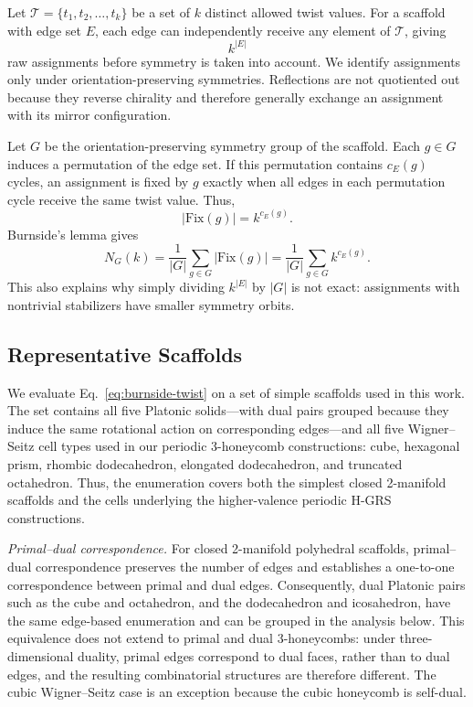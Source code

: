 \documentclass[acmtog]{acmart}
\begin{document}
Let $\mathcal{T}=\{t_1,t_2,\ldots,t_k\}$ be a set of $k$ distinct allowed twist values. For a scaffold with edge set $E$, each edge can independently receive any element of $\mathcal{T}$, giving
\begin{equation}
k^{|E|}
\end{equation}
raw assignments before symmetry is taken into account. We identify assignments only under orientation-preserving symmetries. Reflections are not quotiented out because they reverse chirality and therefore generally exchange an assignment with its mirror configuration.

Let $G$ be the orientation-preserving symmetry group of the scaffold. Each $g\in G$ induces a permutation of the edge set. If this permutation contains $c_E(g)$ cycles, an assignment is fixed by $g$ exactly when all edges in each permutation cycle receive the same twist value. Thus,
\begin{equation}
|\mathrm{Fix}(g)|=k^{c_E(g)}.
\end{equation}
Burnside's lemma gives
\begin{equation}
N_G(k)=\frac{1}{|G|}\sum_{g\in G}|\mathrm{Fix}(g)|
=\frac{1}{|G|}\sum_{g\in G}k^{c_E(g)}.
\label{eq:burnside-twist}
\end{equation}
This also explains why simply dividing $k^{|E|}$ by $|G|$ is not exact: assignments with nontrivial stabilizers have smaller symmetry orbits.

\subsection{Representative Scaffolds}

We evaluate Eq.~\eqref{eq:burnside-twist} on a set of simple scaffolds used in this work. The set contains all five Platonic solids---with dual pairs grouped because they induce the same rotational action on corresponding edges---and all five Wigner--Seitz cell types used in our periodic 3-honeycomb constructions: cube, hexagonal prism, rhombic dodecahedron, elongated dodecahedron, and truncated octahedron. Thus, the enumeration covers both the simplest closed 2-manifold scaffolds and the cells underlying the higher-valence periodic H-GRS constructions.

\textit{Primal--dual correspondence.}
For closed 2-manifold polyhedral scaffolds, primal--dual
correspondence preserves the number of edges and establishes a
one-to-one correspondence between primal and dual edges. Consequently,
dual Platonic pairs such as the cube and octahedron, and the
dodecahedron and icosahedron, have the same edge-based enumeration and
can be grouped in the analysis below. 
This equivalence does not extend to primal and dual 3-honeycombs:
under three-dimensional duality, primal edges correspond to dual
faces, rather than to dual edges, and the resulting combinatorial
structures are therefore different.
The cubic Wigner--Seitz
case is an exception because the cubic honeycomb is self-dual.
\end{document}
